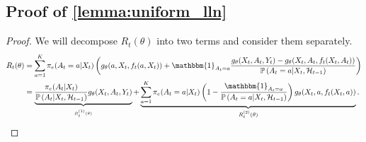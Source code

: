 \documentclass[11pt]{article}
\begin{document}
\begin{appendix}
\subsection{Proof of \cref{lemma:uniform_lln}}
\begin{proof}
We will decompose $R_{t}(\theta)$ into two terms and consider them separately.
\begin{align*}
R_{t}(\theta) &=  \sum_{a=1}^{K} \pi_{e}(A_{t} =a | X_{t}) \left( g_{\theta}(a,X_{t},f_{t}(a,X_{t}))   + \mathbbm{1}_{A_{t} = a} \frac{ g_{\theta}(X_{t},A_{t},Y_{t})  -  g_{\theta}(X_{t},A_{t},f_{t}(X_{t},A_{t})) }{ \mathbb{P} \left(A_{t} =a | X_{t},\mathcal{H}_{t-1} \right)  }\right) \\
&= \underbrace{\frac{\pi_{e}(A_{t} | X_{t})}{\mathbb{P} \left(A_{t} | X_{t},\mathcal{H}_{t-1} \right) }
g_{\theta}(X_{t},A_{t},Y_{t})}_{_{R_t^{(1)}(\theta) }} +   \underbrace{\sum_{a=1}^{K} \pi_{e}(A_{t} =a | X_{t}) \left(1 - \frac{\mathbbm{1}_{A_{t} = a} }{\mathbb{P} \left(A_{t} =a | X_{t},\mathcal{H}_{t-1} \right)}\right) g_{\theta}(X_{t},a,f_{t}(X_{t},a))}_{R_t^{(2)}(\theta) }.
\end{align*}

\end{proof}
\end{appendix}
\end{document}
